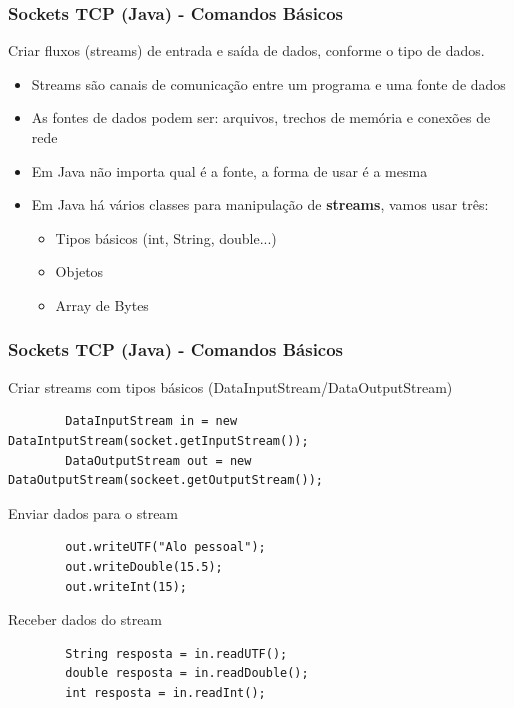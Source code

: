 \documentclass[hyperref={pdfpagelabels=false},table]{beamer}
\begin{document}
\begin{frame}[fragile]
	\frametitle{Sockets TCP (Java) - Comandos Básicos}

	Criar fluxos (streams) de entrada e saída de dados, conforme o tipo de dados.

	\begin{itemize}
		\item Streams são canais de comunicação entre um programa e uma fonte de dados
		\item As fontes de dados podem ser: arquivos, trechos de memória e conexões de rede
		\item Em Java não importa qual é a fonte, a forma de usar é a mesma
		\item Em Java há vários classes para manipulação de \textbf{streams}, vamos usar três:
		\begin{itemize}
			\item Tipos básicos (int, String, double...)
			\item Objetos
			\item Array de Bytes
		\end{itemize}
	\end{itemize}
\end{frame}


\begin{frame}[fragile]
	\frametitle{Sockets TCP (Java) - Comandos Básicos}

	Criar streams com tipos básicos (DataInputStream/DataOutputStream)
	\begin{lstlisting}
		DataInputStream in = new DataIntputStream(socket.getInputStream());
		DataOutputStream out = new DataOutputStream(sockeet.getOutputStream());
	\end{lstlisting} 

	Enviar dados para o stream
	\begin{lstlisting}
		out.writeUTF("Alo pessoal");
		out.writeDouble(15.5);
		out.writeInt(15);
	\end{lstlisting} 

	Receber dados do stream
	\begin{lstlisting}
		String resposta = in.readUTF();
		double resposta = in.readDouble();
		int resposta = in.readInt();
	\end{lstlisting} 
\end{frame}
\end{document}
